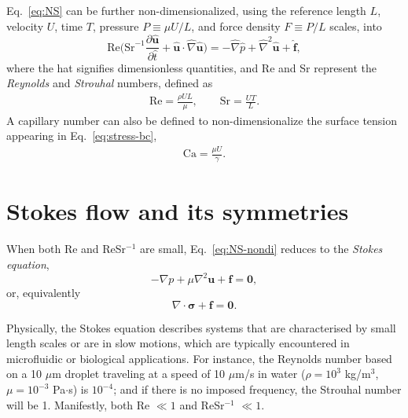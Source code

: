 Eq.\ \eqref{eq:NS} can be further non-dimensionalized, using the reference length $L$, velocity $U$, time $T$, pressure $P \equiv \mu U/L$, and force density $F \equiv P/L$ scales, into
\begin{equation}
   \textrm{Re} \bigg(\textrm{Sr}^{-1} \frac{\partial \hat{\bm u}}{\partial \hat{t}} + \hat{\bm u} \cdot \hat{\nabla} \hat{\bm u} \bigg) =
   -\hat{\nabla} \hat{p} + \hat{\nabla} ^2  \hat{\bm u} + \hat{\bm f},
  \label{eq:NS-nondi}
\end{equation}
where the hat signifies dimensionless quantities, and Re and Sr represent the \emph{Reynolds} and \emph{Strouhal} numbers, defined as
\begin{equation}
  \begin{aligned}
    \textrm{Re} = \frac{\rho UL}{\mu},\quad \quad \textrm{Sr} = \frac{UT}{L}.
  \end{aligned}
\end{equation}
A capillary number can also be defined to non-dimensionalize the surface tension appearing in Eq.\ \eqref{eq:stress-bc},
\begin{equation}
  \begin{aligned}
    \textrm{Ca} = \frac{\mu U}{\gamma}.
  \end{aligned}
\end{equation}




\section{Stokes flow and its symmetries}
\label{sec:stokes-flows}

When both Re and ReSr$^{-1}$ are small, Eq.\ \eqref{eq:NS-nondi} reduces to the \emph{Stokes equation},
\begin{equation}
   -\nabla p + \mu \nabla ^2  {\bm u} + {\bm f} = {\bm 0},
 \label{eq:Stokes}
\end{equation}
or, equivalently
\begin{equation}
   \nabla \cdot  {\bm \sigma} + {\bm f} = {\bm 0}.
 \label{eq:Stokes1}
\end{equation}

Physically, the Stokes equation describes systems that are characterised by small length scales or are in slow motions, which are typically encountered in microfluidic or biological applications.
For instance, the Reynolds number based on a 10 $\mu$m droplet traveling at a speed of 10 $\mu$m/s in water ($\rho=10^3$ kg/m$^{3}$, $\mu=10^{-3}$ Pa$\cdot$s) is $10^{-4}$;
and if there is no imposed frequency, the Strouhal number will be 1.
Manifestly, both Re $\ll 1$ and ReSr$^{-1}$ $\ll 1$.

